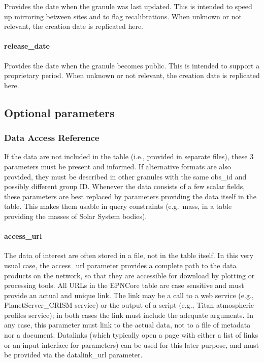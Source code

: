 \documentclass[11pt,a4paper]{ivoa}
\begin{document}
Provides the date when the granule was last updated.
This is intended to speed up mirroring between sites and to flag recalibrations.
When unknown or not relevant, the creation date is replicated here.

\paragraph{release\_date}

Provides the date when the granule becomes public.  This is
intended to support a proprietary period.
When unknown or not relevant, the creation date is replicated here.

\subsection{Optional parameters}

\subsubsection{Data Access Reference}

If the data are not included in the table
(i.e., provided in separate files),
these 3 parameters must be present and informed. If alternative
formats are also provided, they must be described in other granules
with the same obs\_id and possibly different group ID. Whenever the
data consists of a few scalar fields, these parameters are best replaced
by parameters providing the data itself in the table.  This makes them
usable in query constraints (e.g.\ mass, in a table providing the masses of
Solar System bodies).

\paragraph{access\_url}

The data of interest are often stored in a file, not in the table itself.
In this very usual case, the access\_url parameter provides
a complete path to the data products on the network, so that they are
accessible for download by plotting or processing tools. All URLs in the
EPNCore table are case sensitive and must provide an actual and unique
link. The link may be a call to a web service (e.g., PlanetServer\_CRISM
service) or the output of a script (e.g., Titan atmospheric profiles
service); in both cases the link must include the adequate arguments. In
any case, this parameter must link to the actual data, not to a file of
metadata nor a document. Datalinks (which typically open a page with
either a list of links or an input interface for parameters) can be
used for this later purpose, and must be provided via the datalink\_url
parameter.
\end{document}
